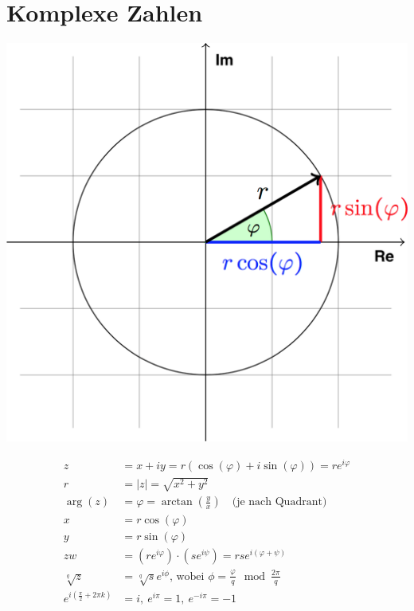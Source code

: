 \documentclass[11pt]{article}
\begin{document}
\section{Komplexe Zahlen}

\begin{minipage}[c]{0.5\textwidth}
\centering
\includegraphics[width=\linewidth,keepaspectratio=true]{images/polarform}
\end{minipage}
%
\begin{minipage}[c]{0.5\textwidth}
\begin{equation*}
\begin{split}
	z & = x + iy = r(\cos(\varphi) + i\sin(\varphi)) = re^{i\varphi} \\
	r & = |z| = \sqrt{x^2 + y^2} \\
	\arg(z) & = \varphi  = \arctan(\frac{y}{x}) \quad \text{(je nach Quadrant)}  \\
	x & = r\cos(\varphi) \\
	y & = r\sin(\varphi) \\
	zw & = (re^{i\varphi})\cdot(se^{i\psi}) = rse^{i(\varphi + \psi)} \\
	\sqrt[q]{z} & = \sqrt[q]{s}e^{i\phi}\text{, wobei }\phi = \frac{\varphi}{q} \mod \frac{2\pi}{q} \\
	e^{i(\frac{\pi}{2} + 2\pi k)} & = i,\ e^{i\pi} = 1, \ e^{-i\pi} = -1
\end{split}
\end{equation*}
\end{minipage}
\end{document}
